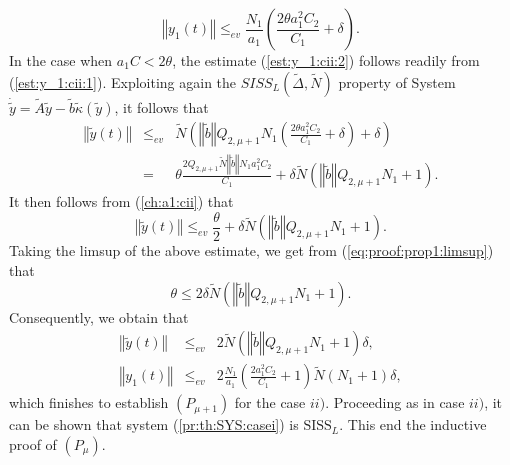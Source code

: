 \documentclass[letterpaper, 10pt]{article}
\newcommand{\rref}[1]{(\ref{#1})}
\newcommand{\norme}[1]{\left\Vert #1\right\Vert}
\newcommand{\siss}{\text{SISS}}
\begin{document}
\begin{equation}
\label{est:y_1:cii:2}
\norme{y_1(t) } \leq_{ev}  \frac{N_1}{a_1} ( \frac{2 \theta a_1^2 C_2}{C_1} + \delta).
\end{equation} In the case when $ a_1 C < 2 \theta $, the estimate \rref{est:y_1:cii:2} follows readily from \rref{est:y_1:cii:1}. Exploiting again the $ SISS_L( \tilde{\Delta}, \tilde{N} )$ property of System $\dot{\tilde{y}} = \tilde{A} \tilde{y}  - \tilde{b}  \tilde{\kappa} (\tilde{y})$, it follows that
\begin{eqnarray*}
\norme{\tilde{y}(t)} & \leq_{ev} & \tilde{N} \left(\norme{\tilde{b}}  Q_{2,\mu +1} N_1 ( \frac{2 \theta a_1^2 C_2}{C_1} + \delta) + \delta \right) \\
& = & \theta \frac{ 2 Q_{2,\mu +1} \tilde{N} \norme{\tilde{b}}  N_1 a_1^2 C_2}{C_1 } + \delta \tilde{N}  ( \norme{\tilde{b}} Q_{2,\mu +1} N_1 + 1 ).
\end{eqnarray*} It then follows from \rref{ch:a1:cii} that
\begin{equation*}
\norme{\tilde{y}(t)}  \leq_{ev} \frac{\theta}{2} +  \delta \tilde{N}  ( \norme{\tilde{b}} Q_{2,\mu +1} N_1 + 1 ).
\end{equation*} Taking the limsup of the above estimate, we get from \rref{eq:proof:prop1:limsup} that
\begin{equation*}
\theta \leq 2 \delta \tilde{N}  ( \norme{\tilde{b}} Q_{2,\mu +1} N_1 + 1 ).
\end{equation*} Consequently, we obtain that
\begin{eqnarray*} 
\norme{\tilde{y}(t)}  & \leq_{ev} & 2  \tilde{N}  ( \norme{\tilde{b}} Q_{2,\mu +1} N_1 + 1 ) \delta ,\\
\norme{y_1(t) } & \leq_{ev} & 2  \frac{N_1}{a_1} ( \frac{2 a_1^2 C_2}{C_1} +1 )  \tilde{N}  ( N_1 + 1 ) \delta,
\end{eqnarray*} which finishes to establish $(P_{\mu +1})$ for the case $ii)$. Proceeding as in case $ii)$, it can be shown that system \rref{pr:th:SYS:casei} is $\siss_L$. This end the inductive proof of $(P_\mu)$. 
\newline
\end{document}
